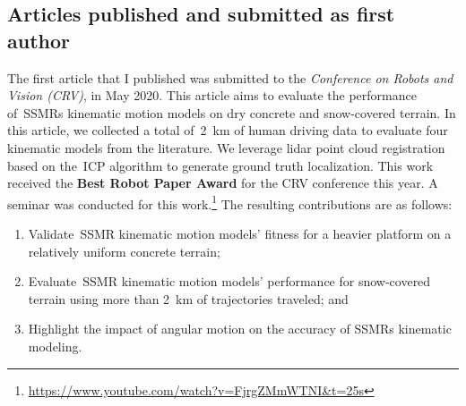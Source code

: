 \documentclass[12pt,letterpaper,oneside]{article}
\begin{document}

\subsection{Articles published and submitted as first author}
\label{sec:first_author}
	\textbf{}

The first article that I published was submitted to the \emph{Conference on Robots and Vision (CRV)}, in May 2020.
This article aims to evaluate the performance of~\acp{SSMR} kinematic motion models on dry concrete and snow-covered terrain.
In this article, we collected a total of~\SI{2}{\kilo\meter} of human driving data to evaluate four kinematic models from the literature.
We leverage lidar point cloud registration based on the~\ac{ICP} algorithm to generate ground truth localization.
This work received the \textbf{Best Robot Paper Award} for the CRV conference this year.
A seminar was conducted for this work.\footnote{\url{https://www.youtube.com/watch?v=FjrgZMmWTNI&t=25s}}
The resulting contributions are as follows:
\begin{enumerate}
	\item Validate~\ac{SSMR} kinematic motion models' fitness for a heavier platform on a relatively uniform concrete terrain;
	\item Evaluate~\ac{SSMR} kinematic motion models' performance for snow-covered terrain using more than \SI{2}{\kilo\meter} of trajectories traveled; and
	\item Highlight the impact of angular motion on the accuracy of \acp{SSMR} kinematic modeling.
\end{enumerate}
\end{document}
